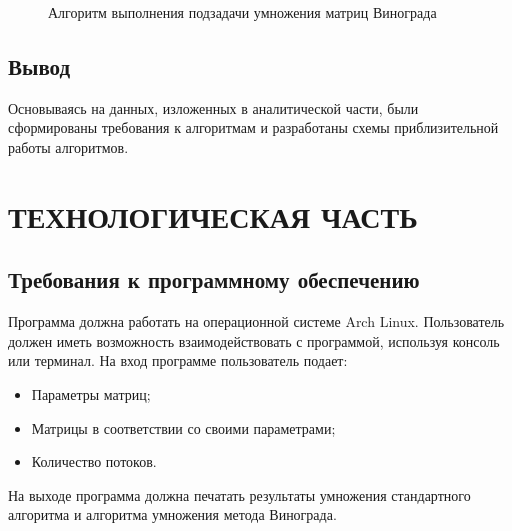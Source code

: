 \documentclass[a4paper,12pt]{article}
\begin{document}
\begin{figure}[p]
\caption{Алгоритм выполнения подзадачи умножения матриц Винограда}
\label{schemes:scheme4}
\end{figure}

\newpage
\subsection{Вывод}
Основываясь на данных, изложенных в аналитической части, были сформированы требования к алгоритмам и разработаны схемы приблизительной работы алгоритмов.

\newpage
\section{ТЕХНОЛОГИЧЕСКАЯ ЧАСТЬ}
\subsection{Требования к программному обеспечению}
Программа должна работать на операционной системе Arch Linux. Пользователь должен иметь возможность взаимодействовать с программой, используя консоль или терминал. На вход программе пользователь подает:
\begin{itemize}
\item Параметры матриц;
\item Матрицы в соответствии со своими параметрами;
\item Количество потоков.
\end{itemize}
На выходе программа должна печатать результаты умножения стандартного алгоритма и алгоритма умножения метода Винограда.
\end{document}
